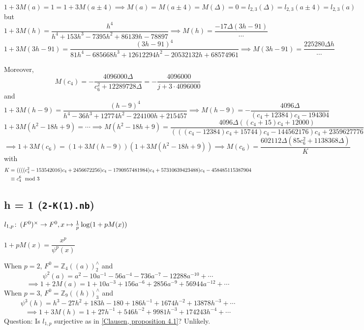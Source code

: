 \documentclass{rs}
\theoremstyle{definition}
\theoremstyle{remark}
\def\co{\colon\thinspace}
\newcommand{\mb}[1]{\mathbb{#1}}
\newcommand{\BZ}{{\mb Z}}
\newcommand{\md}{~~{\rm mod}~}
\newcommand{\p}{\psi^3}
\newcommand{\lp}{(\!(}
\newcommand{\rp}{)\!)}
\numberwithin{equation}{section}
\numberwithin{thm}{section}
\begin{document}
\[
 1 + 3 M(a) = 1 = 1 + 3 M(a \pm 4) \implies M(a) = M(a \pm 4) = M(\Delta) = 0 = l_{2,3}(\Delta) = l_{2,3}(a \pm 4) = l_{2,3}(a) 
\]
but 
\[
 1 + 3 M(h) = \frac{h^4}{h^4 + 153 h^3 - 7395 h^2 + 86139 h - 78897} \implies M(h) = \frac{-17 \Delta (3 h - 91)}{\cdots} 
\]
\[
 1 + 3 M(3 h - 91) = \frac{(3 h - 91)^4}{81 h^4 - 685668 h^3 + 12612294 h^2 - 20532132 h + 68574961} \implies M(3 h - 91) = \frac{225280 \Delta h}{\cdots} 
\]

Moreover, 
\[
 M(c_4) = -\frac{4096000 \Delta}{c_6^2 + 12289728 \Delta} = -\frac{4096000}{j + 3 \cdot 4096000} 
\]
and 
\[
 1 + 3 M(h - 9) = \frac{(h - 9)^4}{h^4 - 36 h^3 + 12774 h^2 - 224100 h + 215457} \implies M(h - 9) = -\frac{4096 \Delta}{(c_4 + 12384) c_4 - 194304} 
\]
\[
 1 + 3 M(h^2 - 18 h + 9) = \cdots \implies M(h^2 - 18 h + 9) = \frac{4096 \Delta ((c_4 + 15) c_4 + 12000)}{(((c_4 - 12384) c_4 + 15744) c_4 - 144562176) c_4 + 2359627776} 
\]
\[
 \implies 1 + 3 M(c_6) = (1 + 3 M(h - 9)) (1 + 3 M(h^2 - 18 h + 9)) \implies M(c_6) = \frac{602112 \Delta (85 c_6^2 + 1138368 \Delta)}{K} 
\]
with 
\begin{equation*}
\begin{split}
    K = & ~ ((((c_4^2 - 153542016) c_4 + 2456672256 ) c_4 - 1790957481984) c_4 + 57310639423488) c_4 - 458485115387904 \\
 \equiv & ~ c_4^6 \md 3 
\end{split}
\end{equation*}


\subsection{h = 1 (\texttt{2-K(1).nb})}

$l_{1,p} \co (F^0)^\times \to F^0, x \mapsto \frac{1}{p} \log(1 + p M(x))$ 

$1 + p M(x) = \dfrac{x^p}{\psi^p(x)}$ 

When $p = 2$, $F^0 = \BZ_4 \lp a \rp_2^\wedge$ and 
\[
 \psi^2(a) = a^2 - 10 a^{-1} - 56 a^{-4} - 736 a^{-7} - 12288 a^{-10} + \cdots 
\]
\[
 \implies 1 + 2 M(a) = 1 + 10 a^{-3} + 156 a^{-6} + 2856 a^{-9} + 56944 a^{-12} + \cdots 
\]
When $p = 3$, $F^0 = \BZ_9 \lp h \rp_3^\wedge$ and 
\[
 \p(h) = h^3 - 27 h^2 + 183 h - 180 + 186 h^{-1} + 1674 h^{-2} + 13878 h^{-3} + \cdots 
\]
\[
 \implies 1 + 3 M(h) = 1 + 27 h^{-1} + 546 h^{-2} + 9981 h^{-3} + 174243 h^{-4} + \cdots 
\]
Question: Is $l_{1,p}$ surjective as in \href{http://arxiv.org/abs/1110.5851}{[Clausen, proposition 4.1]}?  Unlikely.  
\end{document}
